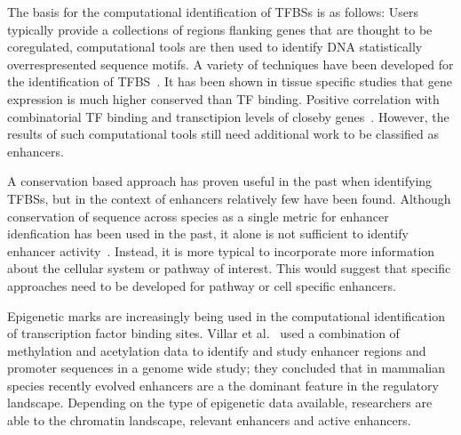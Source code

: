 

        
        The basis for the computational identification of TFBSs is as follows: Users typically provide a collections of regions flanking genes that are thought to be coregulated, computational tools are then used to identify DNA statistically overrespresented sequence motifs. A variety of techniques have been developed for the identification of TFBS~\cite{tompa2005assessing}. It has been shown in tissue specific studies that gene expression is much higher conserved than TF binding. Positive correlation with combinatorial TF binding and transctipion levels of closeby genes~\cite{wong2014decoupling}. However, the results of such computational tools still need additional work to be classified as enhancers. 
        
        A conservation based approach has proven useful in the past when identifying TFBSs, but in the context of enhancers relatively few have been found. Although conservation of sequence across species as a single metric for enhancer idenfication has been used in the past, it alone is not sufficient to identify enhancer activity~\cite{blow2010chip}. Instead, it is more typical to incorporate more information about the cellular system or pathway of interest. 
        This would suggest that specific approaches need to be developed for pathway or cell specific enhancers. 

        Epigenetic marks are increasingly being used in the computational identification of transcription factor binding sites. Villar et al.~\cite{villar2015enhancer} used a combination of methylation and acetylation data to identify and study enhancer regions and promoter sequences in a genome wide study; they concluded that in mammalian species recently evolved enhancers are a the dominant feature in the regulatory landscape. Depending on the type of epigenetic data available, researchers are able to the chromatin landscape, relevant enhancers and active enhancers.
        
